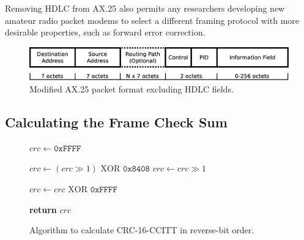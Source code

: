 Removing HDLC from AX.25 also permits any researchers developing new
amateur radio packet modems to select a different framing protocol
with more desirable properties, such as forward error correction.

\begin{figure}
	\centering
	\includegraphics[width=1.0\textwidth]{src/dia/ax25}
	\caption{Modified AX.25 packet format excluding HDLC fields.}
	\label{fig:ax25format}
\end{figure}

\subsection{Calculating the Frame Check Sum}
\label{calcfcs}

\begin{figure}
	\begin{algorithmic}[1]
		\State $crc \gets \texttt{0xFFFF}$

			\State $crc \gets (crc \gg 1) \textrm{ XOR } \texttt{0x8408}$
		\Else
			\State $crc \gets crc \gg 1$
		\EndIf
		\EndFor
		\EndFor

		\State $crc \gets crc \textrm{ XOR } \texttt{0xFFFF}$

		\State \textbf{return} $crc$
		\EndFunction
	\end{algorithmic}
	\caption{Algorithm to calculate CRC-16-CCITT in reverse-bit order.}
	\label{fig:crcccittcode}
\end{figure}

